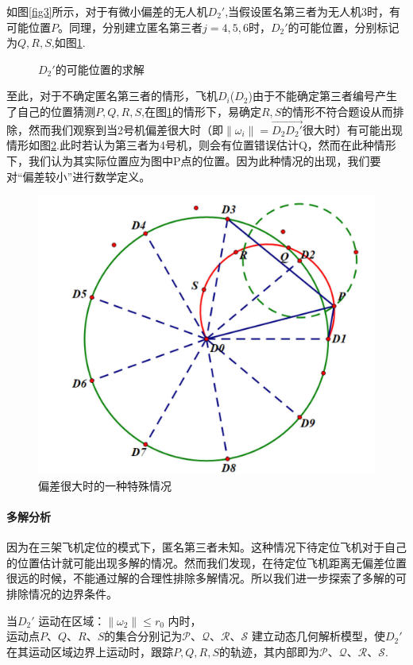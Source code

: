 \documentclass[withoutpreface,bwprint]{cumcmthesis} %
\begin{document}
		
			如图\ref{fig3}所示，对于有微小偏差的无人机$D_2'$,当假设匿名第三者为无人机3时，有可能位置$P$。同理，分别建立匿名第三者$j=4,5,6$时，$D_2'$的可能位置，分别标记为$Q,R,S$,如图\ref{fig4}.
			
			\begin{figure}[htb]
				\centering
				\caption{$D_2'$的可能位置的求解}
				\label{fig4}
			\end{figure}
			
			至此，对于不确定匿名第三者的情形，飞机$D_i$($D_2$)由于不能确定第三者编号产生了自己的位置猜测$P,Q,R,S$,在图\ref{fig4}的情形下，易确定$R,S$的情形不符合题设从而排除，然而我们观察到当2号机偏差很大时（即$\lVert\omega_i\rVert =\overrightarrow{D_2D_2'} $很大时）有可能出现情形如图\ref{fig6}.此时若认为第三者为4号机，则会有位置错误估计Q，然而在此种情形下，我们认为其实际位置应为图中P点的位置。因为此种情况的出现，我们要对“偏差较小”进行数学定义。
			\begin{figure}[htb]
				\centering
				\includegraphics[width=0.5\linewidth]{./figures/6}
				\caption{偏差很大时的一种特殊情况}
				\label{fig6}
			\end{figure}
		
		
			\paragraph{多解分析}
			因为在三架飞机定位的模式下，匿名第三者未知。这种情况下待定位飞机对于自己的位置估计就可能出现多解的情况。然而我们发现，在待定位飞机距离无偏差位置很远的时候，不能通过解的合理性排除多解情况。所以我们进一步探索了多解的可排除情况的边界条件。
			
			
			当$ D_2' $ 运动在区域：$ \lVert \omega _2 \rVert \le r_0 $ 内时，$ \text{运动点}P\text{、}Q\text{、}R\text{、}S\text{的集合分别记为}\mathcal{P}\text{、}\mathcal{Q}\text{、}\mathcal{R}\text{、}\mathcal{S} $ 建立动态几何解析模型，使$ D_2' $在其运动区域边界上运动时，跟踪$P,Q,R,S$的轨迹，其内部即为$\mathcal{P}\text{、}\mathcal{Q}\text{、}\mathcal{R}\text{、}\mathcal{S}$.
			
\end{document}
